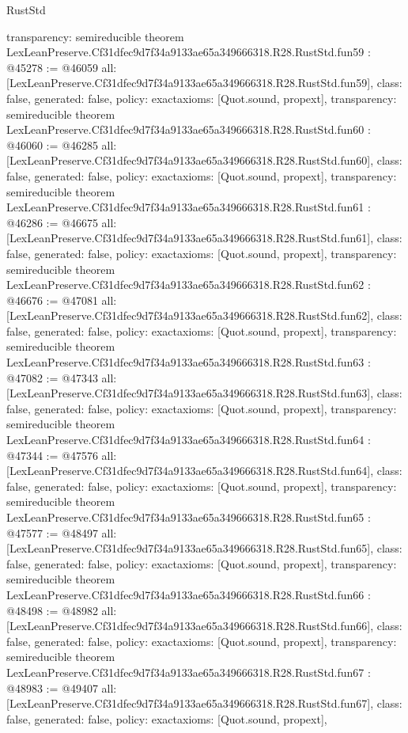 \begin{lexlean}{RustStd}
\begin{coremodule}
{  transparency: semireducible
}
theorem LexLeanPreserve.Cf31dfec9d7f34a9133ae65a349666318.R28.RustStd.fun59 : @45278 := @46059 {
  all: [LexLeanPreserve.Cf31dfec9d7f34a9133ae65a349666318.R28.RustStd.fun59],
  class: false,
  generated: false,
  policy: exact{axioms: [Quot.sound, propext]},
  transparency: semireducible
}
theorem LexLeanPreserve.Cf31dfec9d7f34a9133ae65a349666318.R28.RustStd.fun60 : @46060 := @46285 {
  all: [LexLeanPreserve.Cf31dfec9d7f34a9133ae65a349666318.R28.RustStd.fun60],
  class: false,
  generated: false,
  policy: exact{axioms: [Quot.sound, propext]},
  transparency: semireducible
}
theorem LexLeanPreserve.Cf31dfec9d7f34a9133ae65a349666318.R28.RustStd.fun61 : @46286 := @46675 {
  all: [LexLeanPreserve.Cf31dfec9d7f34a9133ae65a349666318.R28.RustStd.fun61],
  class: false,
  generated: false,
  policy: exact{axioms: [Quot.sound, propext]},
  transparency: semireducible
}
theorem LexLeanPreserve.Cf31dfec9d7f34a9133ae65a349666318.R28.RustStd.fun62 : @46676 := @47081 {
  all: [LexLeanPreserve.Cf31dfec9d7f34a9133ae65a349666318.R28.RustStd.fun62],
  class: false,
  generated: false,
  policy: exact{axioms: [Quot.sound, propext]},
  transparency: semireducible
}
theorem LexLeanPreserve.Cf31dfec9d7f34a9133ae65a349666318.R28.RustStd.fun63 : @47082 := @47343 {
  all: [LexLeanPreserve.Cf31dfec9d7f34a9133ae65a349666318.R28.RustStd.fun63],
  class: false,
  generated: false,
  policy: exact{axioms: [Quot.sound, propext]},
  transparency: semireducible
}
theorem LexLeanPreserve.Cf31dfec9d7f34a9133ae65a349666318.R28.RustStd.fun64 : @47344 := @47576 {
  all: [LexLeanPreserve.Cf31dfec9d7f34a9133ae65a349666318.R28.RustStd.fun64],
  class: false,
  generated: false,
  policy: exact{axioms: [Quot.sound, propext]},
  transparency: semireducible
}
theorem LexLeanPreserve.Cf31dfec9d7f34a9133ae65a349666318.R28.RustStd.fun65 : @47577 := @48497 {
  all: [LexLeanPreserve.Cf31dfec9d7f34a9133ae65a349666318.R28.RustStd.fun65],
  class: false,
  generated: false,
  policy: exact{axioms: [Quot.sound, propext]},
  transparency: semireducible
}
theorem LexLeanPreserve.Cf31dfec9d7f34a9133ae65a349666318.R28.RustStd.fun66 : @48498 := @48982 {
  all: [LexLeanPreserve.Cf31dfec9d7f34a9133ae65a349666318.R28.RustStd.fun66],
  class: false,
  generated: false,
  policy: exact{axioms: [Quot.sound, propext]},
  transparency: semireducible
}
theorem LexLeanPreserve.Cf31dfec9d7f34a9133ae65a349666318.R28.RustStd.fun67 : @48983 := @49407 {
  all: [LexLeanPreserve.Cf31dfec9d7f34a9133ae65a349666318.R28.RustStd.fun67],
  class: false,
  generated: false,
  policy: exact{axioms: [Quot.sound, propext]},
}
\end{coremodule}
\end{lexlean}
